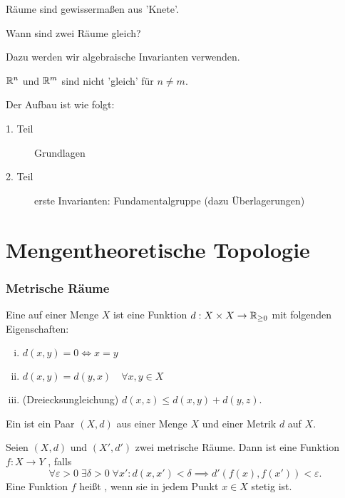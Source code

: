 \begin{idea}
    Räume sind gewissermaßen aus 'Knete'.
\end{idea}
\begin{goal}
    Wann sind zwei Räume gleich?
\end{goal}
Dazu werden wir algebraische Invarianten verwenden.
\begin{example}
    $\mathbb{R}^n$ und $\mathbb{R}^m$ sind nicht 'gleich' für $n\neq m$.
\end{example}
Der Aufbau ist wie folgt:
\begin{description}
    \item[1. Teil] Grundlagen
    \item[2. Teil] erste Invarianten: Fundamentalgruppe (dazu Überlagerungen)
\end{description}


\newpage
\part{Mengentheoretische Topologie}

\section{Metrische Räume}
\begin{definition}[Metrik]\label{def:metrik}
    Eine  auf einer Menge $X$ ist eine Funktion  $d: X\times X \to  \mathbb{R}_{\geq 0}$ mit folgenden Eigenschaften:
    \begin{enumerate}[(i)]
        \item $d(x,y) = 0 \iff  x = y$
        \item $d(x,y) = d(y,x) \quad \forall x,y\in X$
        \item (Dreiecksungleichung) $d(x,z) \leq  d(x,y) + d(y,z)$.
    \end{enumerate}
    Ein  ist ein Paar $(X,d)$ aus einer Menge $X$ und einer Metrik $d$ auf $X$.
\end{definition}

\begin{definition}[Stetigkeit]\label{def:stetig-metrischer-raum}
    Seien $(X,d)$ und  $(X',d')$ zwei metrische Räume. Dann ist eine Funktion $f:X \to  Y$ , falls
    \[
        \forall ε > 0 \; \exists \delta > 0 \; \forall x' \colon d(x,x') < \delta \implies d'(f(x), f(x')) < ε
    .\] 
    Eine Funktion $f$ heißt , wenn sie in jedem Punkt  $x\in X$ stetig ist.
    \begin{minipage}{\textwidth}
        \centering
    \end{minipage}
\end{definition}


